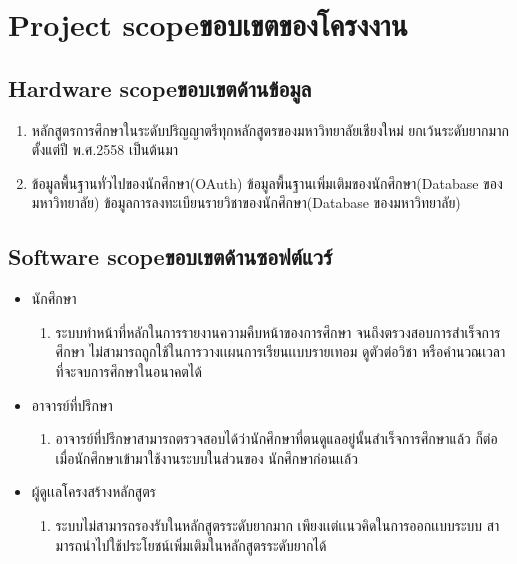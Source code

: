\section{\ifenglish Project scope\else ขอบเขตของโครงงาน\fi}

\subsection{\ifenglish Hardware scope\else ขอบเขตด้านข้อมูล\fi}
\begin{enumerate}
    \item หลักสูตรการศึกษาในระดับปริญญาตรีทุกหลักสูตรของมหาวิทยาลัยเชียงใหม่ ยกเว้นระดับยากมาก ตั้งแต่ปี พ.ศ.2558 เป็นต้นมา
    \item ข้อมูลพื้นฐานทั่วไปของนักศึกษา(OAuth) ข้อมูลพื้นฐานเพิ่มเติมของนักศึกษา(Database ของมหาวิทยาลัย) ข้อมูลการลงทะเบียนรายวิชาของนักศึกษา(Database ของมหาวิทยาลัย)
\end{enumerate}

\subsection{\ifenglish Software scope\else ขอบเขตด้านซอฟต์แวร์\fi}
\begin{itemize}
    \item นักศึกษา
    \begin{enumerate}
        \item ระบบทําหน้าที่หลักในการรายงานความคืบหน้าของการศึกษา จนถึงตรวงสอบการสําเร็จการศึกษา 
        ไม่สามารถถูกใช้ในการวางเเผนการเรียนเเบบรายเทอม ดูตัวต่อวิชา หรือคํานวณเวลาที่จะจบการศึกษาในอนาคตได้
    \end{enumerate}
    \item อาจารย์ที่ปรึกษา
    \begin{enumerate}
        \item อาจารย์ที่ปรึกษาสามารถตรวจสอบได้ว่านักศึกษาที่ตนดูแลอยู่นั้นสําเร็จการศึกษาแล้ว ก็ต่อเมื่อนักศึกษาเข้ามาใช้งานระบบในส่วนของ นักศึกษาก่อนเเล้ว
    \end{enumerate}
    \item ผู้ดูเเลโครงสร้างหลักสูตร
    \begin{enumerate}
        \item ระบบไม่สามารถรองรับในหลักสูตรระดับยากมาก เพียงเเต่เเนวคิดในการออกเเบบระบบ สามารถนําไปใช้ประโยชน์เพิ่มเติมในหลักสูตรระดับยากได้
    \end{enumerate}
\end{itemize}


